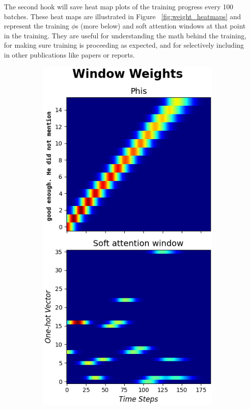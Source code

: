 \documentclass{article}
\begin{document}
The second hook will save heat map plots of the training progress every 100 batches. These heat maps are illustrated in Figure ~\ref{fig:weight_heatmaps} and represent the training $\phi$s (more below) and soft attention windows at that point in the training. They are useful for understanding the math behind the training, for making sure training is proceeding as expected, and for selectively including in other publications like papers or reports.

\begin{figure}[hbt!]
     \centering
     \begin{subfigure}[b]{0.24\textwidth}
         \centering
         \includegraphics[width=\textwidth]{heatmap_weights_1}

\end{subfigure}
\end{figure}
\end{document}
